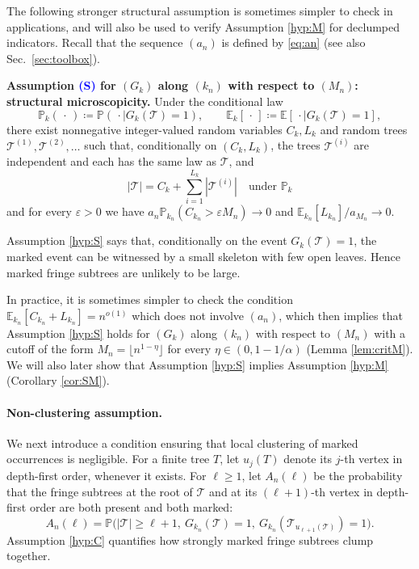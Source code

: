 \documentclass[a4paper,11pt]{article}
\makeatletter
\newcommand{\optionaldesc}[2]{%
  \phantomsection
  #1\protected@edef\@currentlabel{#1}\label{#2}%
}
\newcommand{\E}{\mathbb{E}}
\DeclareRobustCommand{\P}{\mathbb{P}}
\DeclareRobustCommand{\1}{\mathbf{1}}
\makeatother
\begin{document}
The following stronger structural assumption is sometimes simpler to check in applications, and will also be used to verify Assumption \ref{hyp:M} for  declumped indicators. Recall that the sequence $(a_{n})$ is defined by \eqref{eq:an} (see also Sec.~\ref{sec:toolbox}). 

\begin{mdframed}
  \textbf{Assumption \textcolor{blue}{\optionaldesc{(S)}{hyp:S}} for
  $(G_k)$ along $(k_n)$ with respect to $(M_{n})$: structural microscopicity.} Under the conditional law
  $$
    \P_k(\,\cdot\,)\coloneqq\P(\,\cdot\mid G_k(\mathcal T)=1),
    \qquad
    \E_k[\,\cdot\,]\coloneqq\E[\,\cdot\mid G_k(\mathcal T)=1],
  $$
there exist nonnegative integer-valued random variables $C_k,L_k$ and
random trees $\mathcal T^{(1)},\mathcal T^{(2)},\ldots$ such that,
conditionally on $(C_k,L_k)$, the trees $\mathcal T^{(i)}$ are independent and
each has the same law as $\mathcal T$, and
$$
    |\mathcal T|
    =
    C_k+\sum_{i=1}^{L_k}|\mathcal T^{(i)}|
    \quad\text{under } \P_k$$
    and for every $\varepsilon>0$ we have $
a_n\P_{k_n}(C_{k_n}>\varepsilon M_n) \to 0$ and ${\E_{k_n}[L_{k_n}]}/{a_{M_n}} \to 0$.
\end{mdframed}


Assumption \ref{hyp:S} says that, conditionally on the event
$G_k(\mathcal T)=1$, the marked event can be witnessed by a small skeleton
with few open leaves. Hence marked fringe subtrees are unlikely to be large.

In practice, it is sometimes simpler to check the condition  $\E_{k_n}[C_{k_n}+L_{k_n}]
    =
    n^{o(1)}$ which does not involve $(a_{n})$, which then implies that Assumption \ref{hyp:S} holds for
  $(G_k)$ along $(k_n)$ with respect to $(M_{n})$  with a cutoff of the form $M_n=\lfloor n^{1-\eta}\rfloor$ for every $\eta\in(0,1-1/\alpha)$ (Lemma \ref{lem:critM}).  We will also later  show that Assumption \ref{hyp:S} implies Assumption
\ref{hyp:M} (Corollary \ref{cor:SM}).



\paragraph{Non-clustering assumption.}
We next introduce a condition ensuring that local clustering of marked
occurrences is negligible.
For a finite tree $T$, let $u_j(T)$ denote its $j$-th vertex in depth-first
order, whenever it exists. For $\ell\ge1$, let $A_n(\ell)$ be the
probability that the fringe subtrees at the root of $\mathcal T$ and at its
$(\ell+1)$-th vertex in depth-first order are both present and both marked:
$$
A_n(\ell)
=
\P\bigl(
|\mathcal T|\ge \ell+1,\
G_{k_n}(\mathcal T)=1,\
G_{k_n}(\mathcal T_{u_{\ell+1}(\mathcal T)})=1
\bigr).
$$
Assumption \ref{hyp:C} quantifies how strongly marked
fringe subtrees clump together.
\end{document}
